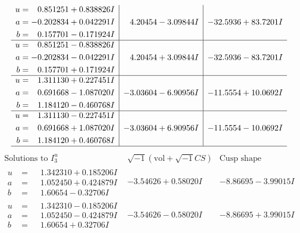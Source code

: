\documentclass[1p]{elsarticle_modified}
\theoremstyle{definition}
\newcommand{\I}{\sqrt{-1}}
\begin{document}
$$\begin{array}{c|c|c}
\begin{aligned}
u &= \phantom{-}0.851251 + 0.838826 I \\
a &= -0.202834 + 0.042291 I \\
b &= \phantom{-}0.157701 - 0.171924 I\end{aligned}
 & \phantom{-}4.20454 - 3.09844 I & -32.5936 + 83.7201 I \\ \hline\begin{aligned}
u &= \phantom{-}0.851251 - 0.838826 I \\
a &= -0.202834 - 0.042291 I \\
b &= \phantom{-}0.157701 + 0.171924 I\end{aligned}
 & \phantom{-}4.20454 + 3.09844 I & -32.5936 - 83.7201 I \\ \hline\begin{aligned}
u &= \phantom{-}1.311130 + 0.227451 I \\
a &= \phantom{-}0.691668 - 1.087020 I \\
b &= \phantom{-}1.184120 - 0.460768 I\end{aligned}
 & -3.03604 - 6.90956 I & -11.5554 + 10.0692 I \\ \hline\begin{aligned}
u &= \phantom{-}1.311130 - 0.227451 I \\
a &= \phantom{-}0.691668 + 1.087020 I \\
b &= \phantom{-}1.184120 + 0.460768 I\end{aligned}
 & -3.03604 + 6.90956 I & -11.5554 - 10.0692 I\\
 \hline 
 \end{array}$$\newpage$$\begin{array}{c|c|c}  
\text{Solutions to }I^u_{3}& \I (\text{vol} + \sqrt{-1}CS) & \text{Cusp shape}\\
 \hline 
\begin{aligned}
u &= \phantom{-}1.342310 + 0.185206 I \\
a &= \phantom{-}1.052450 + 0.424879 I \\
b &= \phantom{-}1.60654 - 0.32706 I\end{aligned}
 & -3.54626 + 0.58020 I & -8.86695 - 3.99015 I \\ \hline\begin{aligned}
u &= \phantom{-}1.342310 - 0.185206 I \\
a &= \phantom{-}1.052450 - 0.424879 I \\
b &= \phantom{-}1.60654 + 0.32706 I\end{aligned}
 & -3.54626 - 0.58020 I & -8.86695 + 3.99015 I \\ \hline\begin{aligned}

\end{aligned}
\end{array}$$
\end{document}
